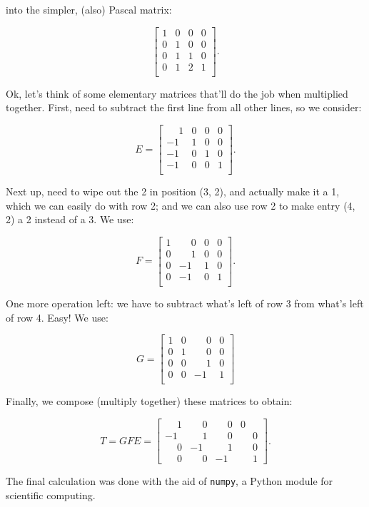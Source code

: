\documentclass{article}
\begin{document}
into the simpler, (also) Pascal matrix:

\[
\begin{bmatrix}
1 & 0 & 0 & 0\\
0 & 1 & 0 & 0\\
0 & 1 & 1 & 0\\
0 & 1 & 2 & 1\\
\end{bmatrix}.
\]

Ok, let's think of some elementary matrices that'll do the job when multiplied together. First, need to subtract the first line from all other lines, so we consider:

\[
E = \begin{bmatrix}
\phantom{-}1 & 0 & 0 & 0\\
-1 & 1 & 0 & 0\\
-1 & 0 & 1 & 0\\
-1 & 0 & 0 & 1\\
\end{bmatrix}.
\]

Next up, need to wipe out the 2 in position (3, 2), and actually make it a 1, which we can easily do with row 2; and we can also use row 2 to make entry (4, 2) a 2 instead of a 3. We use:

\[
F = \begin{bmatrix}
1 & \phantom{-}0 & 0 & 0\\
0 & \phantom{-}1 & 0 & 0\\
0 & -1 & 1 & 0\\
0 & -1 & 0 & 1\\
\end{bmatrix}.
\]

One more operation left: we have to subtract what's left of row 3 from what's left of row 4. Easy! We use:

\[
G = \begin{bmatrix}
1 & 0 & \phantom{-}0 & 0\\
0 & 1 & \phantom{-}0 & 0\\
0 & 0 & \phantom{-}1 & 0\\
0 & 0 & -1 & 1\\
\end{bmatrix}
\]

Finally, we compose (multiply together) these matrices to obtain:

\[
T = GFE = \begin{bmatrix}
\phantom{-}1 & \phantom{-}0 & \phantom{-}0 & 0\\
-1 & \phantom{-}1 & \phantom{-}0 & \phantom{-}0\\
\phantom{-}0 & -1 & \phantom{-}1 & \phantom{-}0\\
\phantom{-}0 & \phantom{-}0 & -1 & \phantom{-}1
\end{bmatrix}.
\]

The final calculation was done with the aid of \texttt{numpy}, a Python module for scientific computing.
\end{document}
